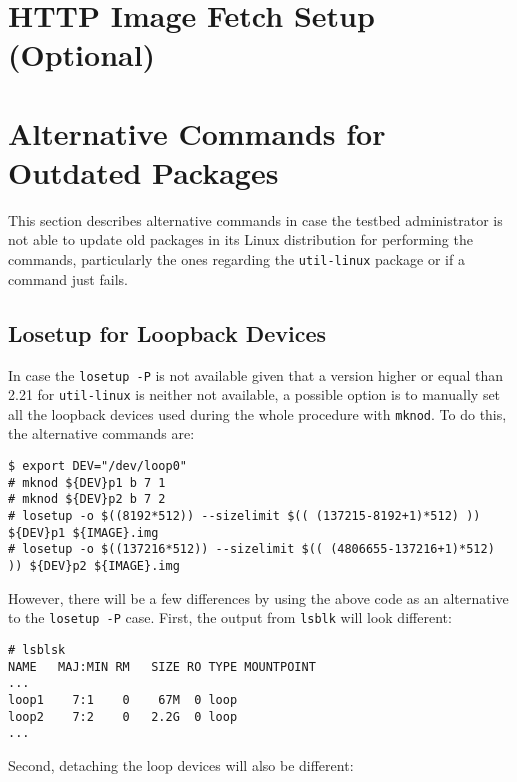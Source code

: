 \section{HTTP Image Fetch Setup (Optional)}
\label{sec:http}



\section{Alternative Commands for Outdated Packages}
This section describes alternative commands in case the testbed administrator
is not able to update old packages in its Linux distribution for performing
the commands, particularly the ones regarding the \texttt{util-linux} package
or if a command just fails.

\subsection{Losetup for Loopback Devices}
\label{sec:alternative_losetup}

In case the \texttt{losetup -P} is not available given that a version
higher or equal than 2.21 for \texttt{util-linux} is neither not available,
a possible option is to manually set all the loopback devices used during the
whole procedure with \texttt{mknod}. To do this, the alternative commands are:

\begin{lstlisting}[]
$ export DEV="/dev/loop0"
# mknod ${DEV}p1 b 7 1
# mknod ${DEV}p2 b 7 2
# losetup -o $((8192*512)) --sizelimit $(( (137215-8192+1)*512) )) ${DEV}p1 ${IMAGE}.img
# losetup -o $((137216*512)) --sizelimit $(( (4806655-137216+1)*512) )) ${DEV}p2 ${IMAGE}.img
\end{lstlisting}
\FloatBarrier
\vspace{-5mm}

However, there will be a few differences by using the above code as an
alternative to the \texttt{losetup -P} case. First, the output from
\texttt{lsblk} will look different:

\begin{lstlisting}[]
# lsblsk
NAME   MAJ:MIN RM   SIZE RO TYPE MOUNTPOINT
...
loop1    7:1    0    67M  0 loop
loop2    7:2    0   2.2G  0 loop
...
\end{lstlisting}
\FloatBarrier
\vspace{-5mm}

Second, detaching the loop devices will also be different:

